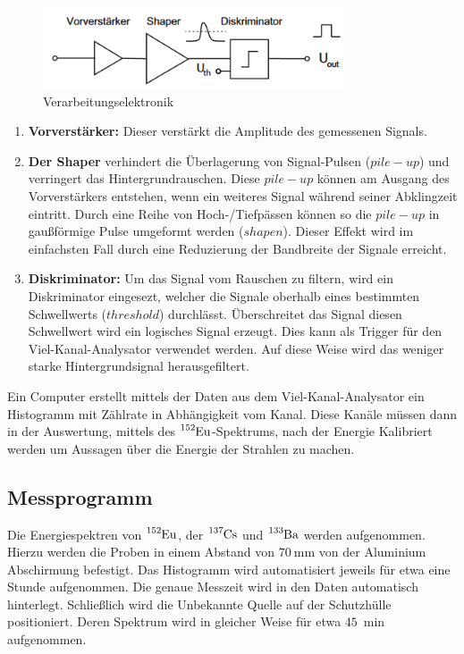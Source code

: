 \begin{figure}
	\centering
	\includegraphics[width=0.8\textwidth]{./Bilder/Elektronik.png}
	\caption{Verarbeitungselektronik \cite{book:kolano}}\label{fig:elek}
\end{figure}

\begin{enumerate}
	\item \textbf{Vorverstärker:} Dieser verstärkt die Amplitude des gemessenen Signals. 
	\item \textbf{Der Shaper} verhindert die Überlagerung von Signal-Pulsen ($pile-up$) und verringert das Hintergrundrauschen. 
	Diese $pile-up$ können am Ausgang des Vorverstärkers entstehen, wenn ein weiteres Signal während seiner Abklingzeit eintritt.
	Durch eine Reihe von Hoch-/Tiefpässen können so die $pile-up$ in gaußförmige Pulse umgeformt werden ($shapen$).
	Dieser Effekt wird im einfachsten Fall durch eine Reduzierung der Bandbreite der Signale erreicht.   
	\item \textbf{Diskriminator:} Um das Signal vom Rauschen zu filtern, wird ein Diskriminator eingesezt, welcher 
	die Signale oberhalb eines bestimmten Schwellwerts ($threshold$) durchlässt.
	Überschreitet das Signal diesen Schwellwert wird ein logisches Signal erzeugt. 
	Dies kann als Trigger für den Viel-Kanal-Analysator verwendet werden.
	Auf diese Weise wird das weniger starke Hintergrundsignal herausgefiltert. 
\end{enumerate}

Ein Computer erstellt mittels der Daten aus dem Viel-Kanal-Analysator ein Histogramm mit Zählrate in Abhängigkeit vom Kanal.
Diese Kanäle müssen dann in der Auswertung, mittels des $\ce{^{152}Eu}$-Spektrums, nach der Energie Kalibriert werden 
um Aussagen über die Energie der Strahlen zu machen.  

\subsection{Messprogramm}
Die Energiespektren von $\ce{^{152}Eu}$, der $\ce{^{137}Cs}$ und $\ce{^{133}Ba}$ werden
aufgenommen. Hierzu werden die Proben in einem Abstand von $\qty{70}{\mm}$ von
der Aluminium Abschirmung befestigt. Das Histogramm wird automatisiert jeweils
für etwa eine Stunde aufgenommen. Die genaue Messzeit wird in den Daten
automatisch hinterlegt. Schließlich wird die Unbekannte Quelle auf der
Schutzhülle positioniert. Deren Spektrum wird in gleicher Weise für etwa
$\qty{45}{\min}$ aufgenommen.
